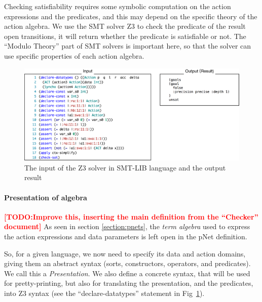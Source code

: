 \documentclass{lncs/llncs}
\newcommand{\TODO}[1]{\textcolor{red}{\textbf{[TODO:#1]}}}
\begin{document}
Checking satisfiability requires some symbolic computation
on the action expressions and the predicates, and this 
may depend on the specific theory of the action algebra. 
We use the SMT solver Z3 to check the predicate of the result open transitions, 
it will return whether the predicate is satisfiable or not.
The ``Modulo Theory'' part of SMT solvers is important here, so that
the solver can use specific properties of each action algebra.


\begin{figure}[t]
    \centerline{\includegraphics[width=\linewidth]{XFIG/SMTLIB2}}
  \caption{The input of the Z3 solver in SMT-LIB language and the output result}  \label{schema:smt-lib}
\end{figure}


\paragraph{Presentation of algebra}

\TODO{Improve this, inserting the main definition from the ``Checker'' document}
As seen in section
\ref{section:pnets}, the \emph{term algebra} used to express the
action expressions and data parameters is left open in
the pNet definition.

So, for a given language, we now need to specify its data and action
domains, giving them an abstract syntax (sorts, constructors, operators,
and predicates). We call this a \emph{Presentation}.
We also define a concrete syntax, that will be used for
pretty-printing, but also for translating the presentation, and the
predicates, into Z3 syntax (see the ``declare-datatypes'' statement in
Fig~\ref{schema:smt-lib}). 
\end{document}
